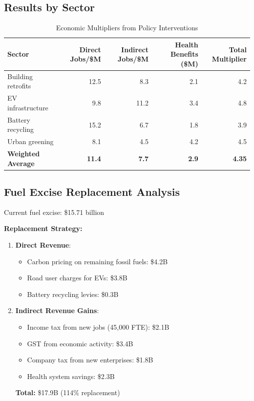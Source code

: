 \documentclass[12pt,a4paper]{article}
\begin{document}
\subsection{Results by Sector}

\begin{table}[h]
\centering
\caption{Economic Multipliers from Policy Interventions}
\begin{tabular}{lrrrr}
\toprule
\textbf{Sector} & \textbf{Direct Jobs/\$M} & \textbf{Indirect Jobs/\$M} & \textbf{Health Benefits (\$M)} & \textbf{Total Multiplier} \\
\midrule
Building retrofits & 12.5 & 8.3 & 2.1 & 4.2 \\
EV infrastructure & 9.8 & 11.2 & 3.4 & 4.8 \\
Battery recycling & 15.2 & 6.7 & 1.8 & 3.9 \\
Urban greening & 8.1 & 4.5 & 4.2 & 4.5 \\
\midrule
\textbf{Weighted Average} & \textbf{11.4} & \textbf{7.7} & \textbf{2.9} & \textbf{4.35} \\
\bottomrule
\end{tabular}
\end{table}

\subsection{Fuel Excise Replacement Analysis}

Current fuel excise: \$15.71 billion

\textbf{Replacement Strategy:}
\begin{enumerate}
    \item \textbf{Direct Revenue}: 
    \begin{itemize}
        \item Carbon pricing on remaining fossil fuels: \$4.2B
        \item Road user charges for EVs: \$3.8B
        \item Battery recycling levies: \$0.3B
    \end{itemize}
    
    \item \textbf{Indirect Revenue Gains}:
    \begin{itemize}
        \item Income tax from new jobs (45,000 FTE): \$2.1B
        \item GST from economic activity: \$3.4B
        \item Company tax from new enterprises: \$1.8B
        \item Health system savings: \$2.3B
    \end{itemize}
    
    \textbf{Total:} \$17.9B (114\% replacement)
\end{enumerate}
\end{document}
